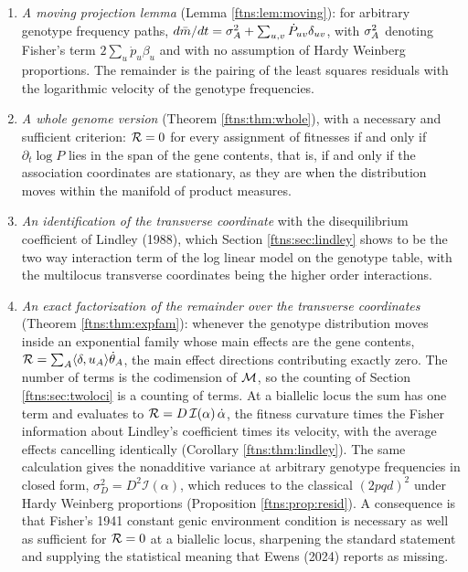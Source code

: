 \begin{enumerate}
\item \emph{A moving projection lemma} (Lemma \ref{ftns:lem:moving}): for arbitrary genotype frequency
paths, $d\bar{m}/dt=\sigma^{2}_{A}+\sum_{u,v}\dot P_{uv}\delta_{uv}$, with $\sigma^{2}_{A}$ denoting Fisher's term $2\sum_u\dot p_u\beta_u$ and with no assumption of Hardy Weinberg
proportions. The remainder is the pairing of the least squares residuals with the logarithmic
velocity of the genotype frequencies.

\item \emph{A whole genome version} (Theorem \ref{ftns:thm:whole}), with a necessary and sufficient
criterion: $\mathcal{R}=0$ for every assignment of fitnesses if and only if $\partial_t\log P$ lies in the
span of the gene contents, that is, if and only if the association coordinates are stationary, as they are when the distribution moves within the manifold of
product measures.

\item \emph{An identification of the transverse coordinate} with the disequilibrium coefficient
of Lindley (1988), which Section \ref{ftns:sec:lindley} shows to be the two way interaction term of the
log linear model on the genotype table, with the multilocus transverse coordinates being the
higher order interactions.

\item \emph{An exact factorization of the remainder over the transverse coordinates}
(Theorem \ref{ftns:thm:expfam}): whenever the genotype distribution moves inside an exponential family
whose main effects are the gene contents, $\mathcal{R}=\sum_A\langle\delta,u_A\rangle\dot\theta_A$, the
main effect directions contributing exactly zero. The number of terms is the codimension of $\mathcal{M}$,
so the counting of Section \ref{ftns:sec:twoloci} is a counting of terms. At a biallelic locus the sum
has one term and evaluates to $\mathcal{R}=D\,\mathcal{I}(\alpha)\,\dot\alpha$, the fitness curvature times
the Fisher information about Lindley's coefficient times its velocity, with the average
effects cancelling identically (Corollary \ref{ftns:thm:lindley}). The same calculation gives the
nonadditive variance at arbitrary genotype frequencies in closed form, $\sigma^2_D=D^2\mathcal{I}(\alpha)$,
which reduces to the classical $(2pqd)^2$ under Hardy Weinberg proportions
(Proposition \ref{ftns:prop:resid}). A consequence is that Fisher's 1941
constant genic environment condition is necessary as well as sufficient for $\mathcal{R}=0$ at a biallelic
locus, sharpening the standard statement and supplying the statistical meaning that Ewens (2024)
reports as missing.


\end{enumerate}
